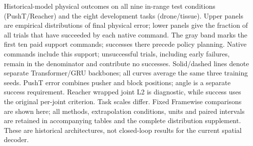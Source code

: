 Historical-model physical outcomes on all nine in-range test conditions (PushT/Reacher) and the eight development tasks (drone/tissue). Upper panels are empirical distributions of final physical error; lower panels give the fraction of all trials that have succeeded by each native command. The gray band marks the first ten paid support commands; successes there precede policy planning. Native commands include this support; unsuccessful trials, including early failures, remain in the denominator and contribute no successes. Solid/dashed lines denote separate Transformer/GRU backbones; all curves average the same three training seeds. PushT error combines pusher and block positions; angle is a separate success requirement. Reacher wrapped joint L2 is diagnostic, while success uses the original per-joint criterion. Task scales differ. Fixed Framewise comparisons are shown here; all methods, extrapolation conditions, units and paired intervals are retained in accompanying tables and the complete distribution supplement. These are historical architectures, not closed-loop results for the current spatial decoder.
